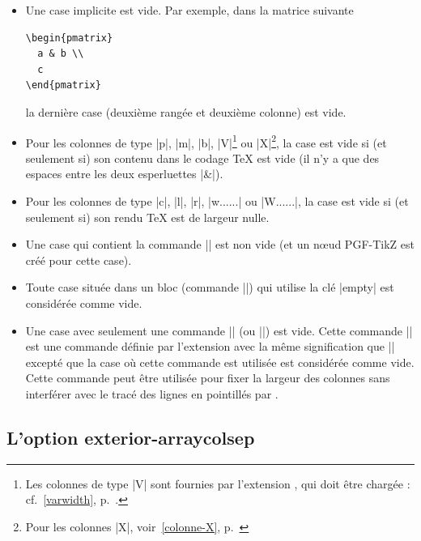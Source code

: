 \documentclass[dvipsnames]{article}
\begin{document}
\begin{itemize}[beginpenalty=10000]
\item Une case implicite est vide. Par exemple, dans la matrice suivante

\begin{Verbatim}
\begin{pmatrix}
  a & b \\
  c
\end{pmatrix}
\end{Verbatim}

la dernière case (deuxième rangée et deuxième colonne) est vide.

\medskip
\item Pour les colonnes de type |p|, |m|, |b|, |V|\footnote{Les colonnes de type
  |V| sont fournies par l'extension , qui doit être chargée :
  cf.~\ref{varwidth}, p.~\pageref{varwidth}.} ou |X|\footnote{Pour les colonnes
  |X|, voir~\ref{colonne-X}, p.~\pageref{colonne-X}}, la case est vide si (et
seulement si) son contenu dans le codage TeX est vide (il n'y a que des espaces
entre les deux esperluettes |&|).

\medskip
\item Pour les colonnes de type |c|, |l|, |r|, |w{...}{...}| ou |W{...}{...}|,
la case est vide si (et seulement si) son rendu TeX est de largeur nulle.

\medskip
\item Une case qui contient la commande |\NotEmpty| est non vide (et un nœud
PGF-TikZ est créé pour cette case).

\medskip
\item Toute case située dans un bloc (commande |\Block|) qui utilise la clé |empty|
est considérée comme vide.

\medskip
\item Une case avec seulement une commande |\Hspace| (ou |\Hspace*|) est vide.
Cette commande |\Hspace| est une commande définie par l'extension
 avec la même signification que |\hspace| excepté que la case où
cette commande est utilisée est considérée comme vide. Cette commande peut être
utilisée pour fixer la largeur des colonnes sans interférer avec le tracé des
lignes en pointillés par .
\end{itemize}




\subsection{L'option exterior-arraycolsep}
\end{document}

